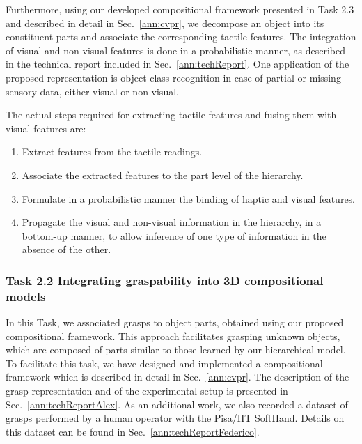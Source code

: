 \documentclass[a4paper,11pt,pdf]{pacmanreport}
\begin{document}
Furthermore, using our developed compositional framework presented in Task 2.3 
and described in detail in Sec.~\ref{ann:cvpr}, we decompose an object into its 
constituent parts and associate the corresponding tactile features. The 
integration of visual and non-visual features is done in a probabilistic manner, 
as described in the technical report included in Sec.~\ref{ann:techReport}. One 
application of the proposed representation is object class recognition in case 
of partial or missing sensory data, either visual or non-visual.

The actual steps required for extracting tactile features and fusing them with 
visual features are:

\begin{enumerate}

\item Extract features from the tactile readings.
\item Associate the extracted features to the part level of the hierarchy.
\item Formulate in a probabilistic manner the binding of haptic and visual features.
\item Propagate the visual and non-visual information in the
  hierarchy, in a bottom-up manner, to allow inference of one type of
  information in the absence of the other.
\end{enumerate}


\subsubsection{Task 2.2 Integrating graspability into 3D compositional models}

In this Task, we associated grasps to object parts, obtained using our proposed 
compositional framework. This approach facilitates grasping unknown objects, 
which are composed of parts similar to those learned by our hierarchical model. 
To facilitate this task, we have designed and implemented a compositional 
framework which is described in detail in Sec.~\ref{ann:cvpr}. The description 
of the grasp representation and of the experimental setup is presented in Sec.~\ref{ann:techReportAlex}.
As an additional work, we also recorded a dataset of grasps performed by a 
human operator with the Pisa/IIT SoftHand. Details on this dataset can be 
found in Sec.~\ref{ann:techReportFederico}.
\end{document}

